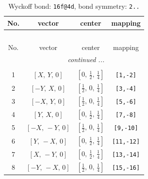 \documentclass[fleqn,8pt]{jsarticle}
\begin{document}
\begin{longtable}{cccc}
\caption{Wyckoff bond: {\tt 16f@4d}, bond symmetry: {\tt 2..}}
 \\
 \hline \hline
No. & vector & center & mapping \\ \hline \endfirsthead

\multicolumn{3}{l}{\tablename\ \thetable{}} \\
 \hline \hline
No. & vector & center & mapping \\ \hline \endhead

 \hline \hline
\multicolumn{3}{r}{\footnotesize\it continued ...} \\ \endfoot

 \hline \hline
\multicolumn{3}{r}{} \\ \endlastfoot

1 & $\left[ X,\, Y,\, 0 \right]$ & $\left[ 0,\, \frac{1}{2},\, \frac{1}{4} \right]$ & {\tt [1,-2]} \\ \hline
2 & $\left[ - Y,\, X,\, 0 \right]$ & $\left[ \frac{1}{2},\, 0,\, \frac{1}{4} \right]$ & {\tt [3,-4]} \\ \hline
3 & $\left[ - X,\, Y,\, 0 \right]$ & $\left[ \frac{1}{2},\, 0,\, \frac{1}{4} \right]$ & {\tt [5,-6]} \\ \hline
4 & $\left[ Y,\, X,\, 0 \right]$ & $\left[ 0,\, \frac{1}{2},\, \frac{1}{4} \right]$ & {\tt [7,-8]} \\ \hline
5 & $\left[ - X,\, - Y,\, 0 \right]$ & $\left[ \frac{1}{2},\, 0,\, \frac{1}{4} \right]$ & {\tt [9,-10]} \\ \hline
6 & $\left[ Y,\, - X,\, 0 \right]$ & $\left[ 0,\, \frac{1}{2},\, \frac{1}{4} \right]$ & {\tt [11,-12]} \\ \hline
7 & $\left[ X,\, - Y,\, 0 \right]$ & $\left[ 0,\, \frac{1}{2},\, \frac{1}{4} \right]$ & {\tt [13,-14]} \\ \hline
8 & $\left[ - Y,\, - X,\, 0 \right]$ & $\left[ \frac{1}{2},\, 0,\, \frac{1}{4} \right]$ & {\tt [15,-16]} \\
\end{longtable}
\renewcommand{\arraystretch}{1.2}
\end{document}
